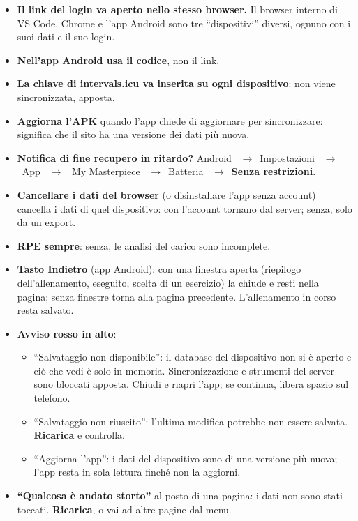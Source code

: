 \documentclass[11pt,a4paper]{article}
\newcommand{\ra}{\unskip\nobreak\ $\rightarrow$\ \ignorespaces}            %
\newcommand{\bt}[1]{\textbf{#1}}               %
\begin{document}
\begin{itemize}
  \item \bt{Il link del login va aperto nello stesso browser.} Il browser interno di VS Code,
    Chrome e l'app Android sono tre ``dispositivi'' diversi, ognuno con i suoi dati e il suo login.
  \item \bt{Nell'app Android usa il codice}, non il link.
  \item \bt{La chiave di intervals.icu va inserita su ogni dispositivo}: non viene sincronizzata, apposta.
  \item \bt{Aggiorna l'APK} quando l'app chiede di aggiornare per sincronizzare: significa che il
    sito ha una versione dei dati più nuova.
  \item \bt{Notifica di fine recupero in ritardo?} Android \ra Impostazioni \ra App \ra
    My Masterpiece \ra Batteria \ra \bt{Senza restrizioni}.
  \item \bt{Cancellare i dati del browser} (o disinstallare l'app senza account) cancella i dati
    di quel dispositivo: con l'account tornano dal server; senza, solo da un export.
  \item \bt{RPE sempre}: senza, le analisi del carico sono incomplete.
  \item \bt{Tasto Indietro} (app Android): con una finestra aperta (riepilogo dell'allenamento,
    eseguito, scelta di un esercizio) la chiude e resti nella pagina; senza finestre torna alla
    pagina precedente. L'allenamento in corso resta salvato.
  \item \bt{Avviso rosso in alto}:
    \begin{itemize}
      \item ``Salvataggio non disponibile'': il database del dispositivo non si è aperto e ciò che
        vedi è solo in memoria. Sincronizzazione e strumenti del server sono bloccati apposta.
        Chiudi e riapri l'app; se continua, libera spazio sul telefono.
      \item ``Salvataggio non riuscito'': l'ultima modifica potrebbe non essere salvata.
        \bt{Ricarica} e controlla.
      \item ``Aggiorna l'app'': i dati del dispositivo sono di una versione più nuova; l'app resta
        in sola lettura finché non la aggiorni.
    \end{itemize}
  \item \bt{``Qualcosa è andato storto''} al posto di una pagina: i dati non sono stati toccati.
    \bt{Ricarica}, o vai ad altre pagine dal menu.
\end{itemize}
\end{document}
